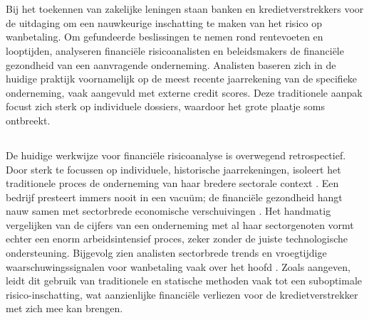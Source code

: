 
\chapter{}%
\label{ch:inleiding}

Bij het toekennen van zakelijke leningen staan banken en kredietverstrekkers voor de uitdaging om een nauwkeurige inschatting te maken van het risico op wanbetaling. Om gefundeerde beslissingen te nemen rond rentevoeten en looptijden, analyseren financiële risicoanalisten en beleidsmakers de financiële gezondheid van een aanvragende onderneming. Analisten baseren zich in de huidige praktijk voornamelijk op de meest recente jaarrekening van de specifieke onderneming, vaak aangevuld met externe credit scores. Deze traditionele aanpak focust zich sterk op individuele dossiers, waardoor het grote plaatje soms ontbreekt.

\section{}%
\label{sec:probleemstelling}

De huidige werkwijze voor financiële risicoanalyse is overwegend retrospectief. Door sterk te focussen op individuele, historische jaarrekeningen, isoleert het traditionele proces de onderneming van haar bredere sectorale context \autocite{Qiang2024}. Een bedrijf presteert immers nooit in een vacuüm; de financiële gezondheid hangt nauw samen met sectorbrede economische verschuivingen \autocite{Bhattarai2024}. Het handmatig vergelijken van de cijfers van een onderneming met al haar sectorgenoten vormt echter een enorm arbeidsintensief proces, zeker zonder de juiste technologische ondersteuning. Bijgevolg zien analisten sectorbrede trends en vroegtijdige waarschuwingssignalen voor wanbetaling vaak over het hoofd \autocite{Bhattarai2024}. Zoals \textcite{Qiang2024} aangeven, leidt dit gebruik van traditionele en statische methoden vaak tot een suboptimale risico-inschatting, wat aanzienlijke financiële verliezen voor de kredietverstrekker met zich mee kan brengen.

\section{}%
\label{sec:onderzoeksdoelstelling}

